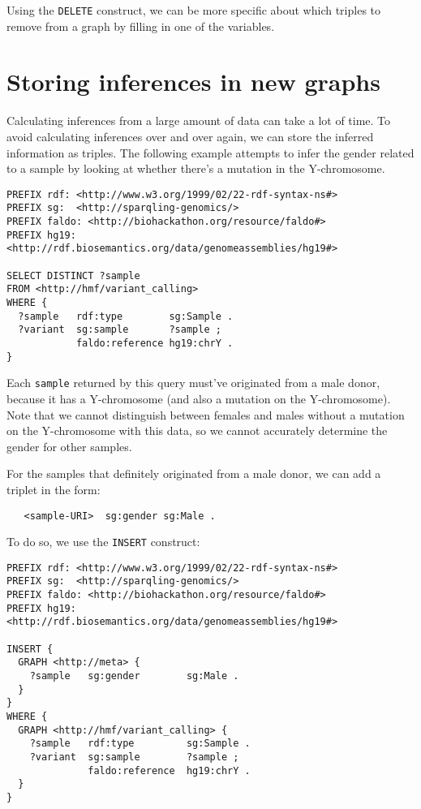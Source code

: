   Using the \texttt{DELETE} construct, we can be more specific about which
  triples to remove from a graph by filling in one of the variables.

\section{Storing inferences in new graphs}
\label{sec:storing-inferences-in-new-graphs}
  Calculating inferences from a large amount of data can take a lot of time.
  To avoid calculating inferences over and over again, we can store the
  inferred information as triples.  The following example attempts to infer
  the gender related to a sample by looking at whether there's a mutation in
  the Y-chromosome.

\begin{siderules}
\begin{verbatim}
PREFIX rdf: <http://www.w3.org/1999/02/22-rdf-syntax-ns#>
PREFIX sg:  <http://sparqling-genomics/>
PREFIX faldo: <http://biohackathon.org/resource/faldo#>
PREFIX hg19:  <http://rdf.biosemantics.org/data/genomeassemblies/hg19#>

SELECT DISTINCT ?sample
FROM <http://hmf/variant_calling>
WHERE {
  ?sample   rdf:type        sg:Sample .
  ?variant  sg:sample       ?sample ;
            faldo:reference hg19:chrY .
}
\end{verbatim}
\end{siderules}

 Each \texttt{sample} returned by this query must've originated from a male
 donor, because it has a Y-chromosome (and also a mutation on the
 Y-chromosome).  Note that we cannot distinguish between females and males
 without a mutation on the Y-chromosome with this data, so we cannot accurately
 determine the gender for other samples.

 For the samples that definitely originated from a male donor, we can add a
 triplet in the form:

\begin{siderules}
\begin{verbatim}
   <sample-URI>  sg:gender sg:Male .
\end{verbatim}
\end{siderules}

  To do so, we use the \texttt{INSERT} construct:

\begin{siderules}
\begin{verbatim}
PREFIX rdf: <http://www.w3.org/1999/02/22-rdf-syntax-ns#>
PREFIX sg:  <http://sparqling-genomics/>
PREFIX faldo: <http://biohackathon.org/resource/faldo#>
PREFIX hg19:  <http://rdf.biosemantics.org/data/genomeassemblies/hg19#>

INSERT {
  GRAPH <http://meta> {
    ?sample   sg:gender        sg:Male .
  }
}
WHERE {
  GRAPH <http://hmf/variant_calling> {
    ?sample   rdf:type         sg:Sample .
    ?variant  sg:sample        ?sample ;
              faldo:reference  hg19:chrY .
  }
}
\end{verbatim}
\end{siderules}


